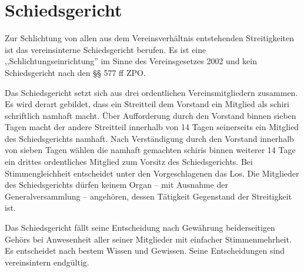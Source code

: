 \documentclass{article}
\begin{document}
\section{Schiedsgericht}\label{schiedsgericht}
\begin{absatz}
    \item Zur Schlichtung von allen aus dem Vereinsverhältnis entstehenden Streitigkeiten ist das vereinsinterne Schiedsgericht berufen. Es ist eine ,,Schlichtungseinrichtung'' im Sinne des Vereinsgesetzes 2002 und kein Schiedsgericht nach den §§ 577 ff ZPO.
    \item Das Schiedsgericht setzt sich aus drei ordentlichen Vereinsmitgliedern zusammen. Es wird derart gebildet, dass ein Streitteil dem Vorstand ein Mitglied als \gls{schiri} schriftlich namhaft macht. Über Aufforderung durch den Vorstand binnen sieben Tagen macht der andere Streitteil innerhalb von 14 Tagen seinerseits ein Mitglied des Schiedsgerichts namhaft. Nach Verständigung durch den Vorstand innerhalb von sieben Tagen wählen die namhaft gemachten \glspl{schiri} binnen weiterer 14 Tage ein drittes ordentliches Mitglied zum Vorsitz des Schiedsgerichts. Bei Stimmengleichheit entscheidet unter den Vorgeschlagenen das Los. Die Mitglieder des Schiedsgerichts dürfen keinem Organ – mit Ausnahme der Generalversammlung – angehören, dessen Tätigkeit Gegenstand der Streitigkeit ist.
    \item Das Schiedsgericht fällt seine Entscheidung nach Gewährung beiderseitigen Gehörs bei Anwesenheit aller seiner Mitglieder mit einfacher Stimmenmehrheit. Es entscheidet nach bestem Wissen und Gewissen. Seine Entscheidungen sind vereinsintern endgültig.
\end{absatz}
\end{document}
